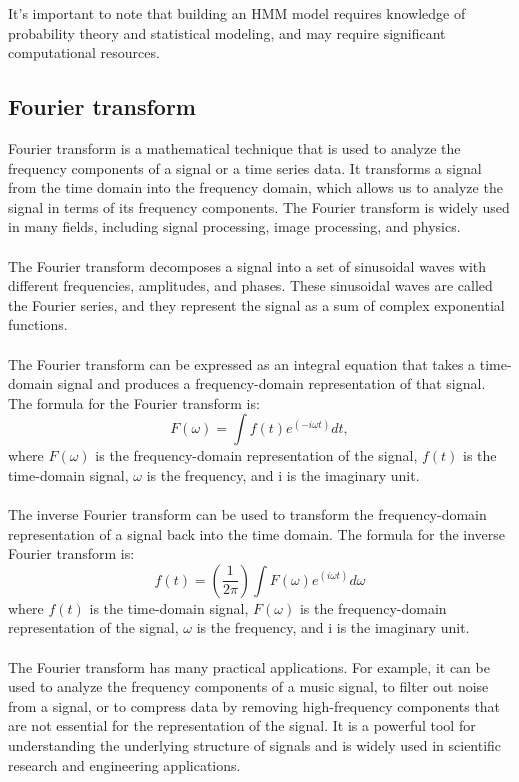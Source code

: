         It's important to note that building an HMM model requires knowledge of probability theory and statistical
        modeling, and may require significant computational resources.
        \subsection{Fourier transform} \label{subsec:furier}
        Fourier transform is a mathematical technique that is used to analyze the frequency components of a signal or a time series data.
        It transforms a signal from the time domain into the frequency domain, which allows us to analyze the signal in terms of its frequency components.
        The Fourier transform is widely used in many fields, including signal processing, image processing, and physics.\\
        \\
        The Fourier transform decomposes a signal into a set of sinusoidal waves with different frequencies, amplitudes, and phases.
        These sinusoidal waves are called the Fourier series, and they represent the signal as a sum of complex exponential functions.\\
        \\
        The Fourier transform can be expressed as an integral equation that takes a time-domain signal and produces a frequency-domain
        representation of that signal. The formula for the Fourier transform is:\\
        \begin{equation}
            F(\omega) = \int f(t) e^{(-i \omega t)} dt,
        \end{equation}
        where $F(\omega)$ is the frequency-domain representation of the signal, $f(t)$ is the time-domain signal, $\omega$ is the frequency,
        and i is the imaginary unit.\\
        \\
        The inverse Fourier transform can be used to transform the frequency-domain representation of a signal back into the time domain.
        The formula for the inverse Fourier transform is:
        \begin{equation}
            f(t) = (\frac{1}{2\pi}) \int F(\omega) e^{(i \omega t)} d\omega
        \end{equation}
        where $f(t)$ is the time-domain signal, $F(\omega)$ is the frequency-domain representation of the signal, $\omega$ is the frequency,
        and i is the imaginary unit.\\
        \\
        The Fourier transform has many practical applications. For example, it can be used to analyze the frequency components of a music signal,
        to filter out noise from a signal, or to compress data by removing high-frequency components that are not essential for the representation of the signal.
        It is a powerful tool for understanding the underlying structure of signals and is widely used in scientific research and engineering applications.
